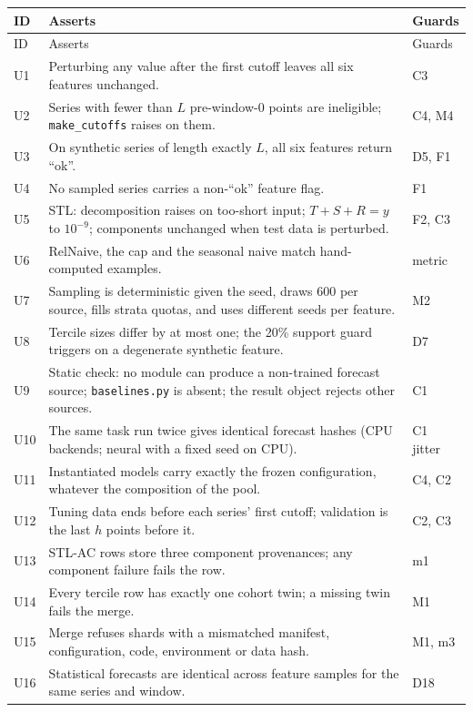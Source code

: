 \documentclass[11pt,a4paper]{article}
\newcommand{\code}[1]{\texttt{#1}}
\begin{document}
{\small
\begin{longtable}{@{}p{0.7cm} p{10.8cm} p{3.6cm}@{}}
\toprule
ID & Asserts & Guards \\
\midrule
\endfirsthead
\toprule
ID & Asserts & Guards \\
\midrule
\endhead
\bottomrule
\endfoot
U1 & Perturbing any value after the first cutoff leaves all six features unchanged. & C3 \\
U2 & Series with fewer than $L$ pre-window-0 points are ineligible; \code{make_cutoffs} raises on them. & C4, M4 \\
U3 & On synthetic series of length exactly $L$, all six features return ``ok''. & D5, F1 \\
U4 & No sampled series carries a non-``ok'' feature flag. & F1 \\
U5 & STL: decomposition raises on too-short input; $T+S+R = y$ to $10^{-9}$; components unchanged when test data is perturbed. & F2, C3 \\
U6 & RelNaive, the cap and the seasonal naive match hand-computed examples. & metric \\
U7 & Sampling is deterministic given the seed, draws 600 per source, fills strata quotas, and uses different seeds per feature. & M2 \\
U8 & Tercile sizes differ by at most one; the 20\% support guard triggers on a degenerate synthetic feature. & D7 \\
U9 & Static check: no module can produce a non-trained forecast source; \code{baselines.py} is absent; the result object rejects other sources. & C1 \\
U10 & The same task run twice gives identical forecast hashes (CPU backends; neural with a fixed seed on CPU). & C1 jitter \\
U11 & Instantiated models carry exactly the frozen configuration, whatever the composition of the pool. & C4, C2 \\
U12 & Tuning data ends before each series' first cutoff; validation is the last $h$ points before it. & C2, C3 \\
U13 & STL-AC rows store three component provenances; any component failure fails the row. & m1 \\
U14 & Every tercile row has exactly one cohort twin; a missing twin fails the merge. & M1 \\
U15 & Merge refuses shards with a mismatched manifest, configuration, code, environment or data hash. & M1, m3 \\
U16 & Statistical forecasts are identical across feature samples for the same series and window. & D18 \\

\end{longtable}}
\end{document}

